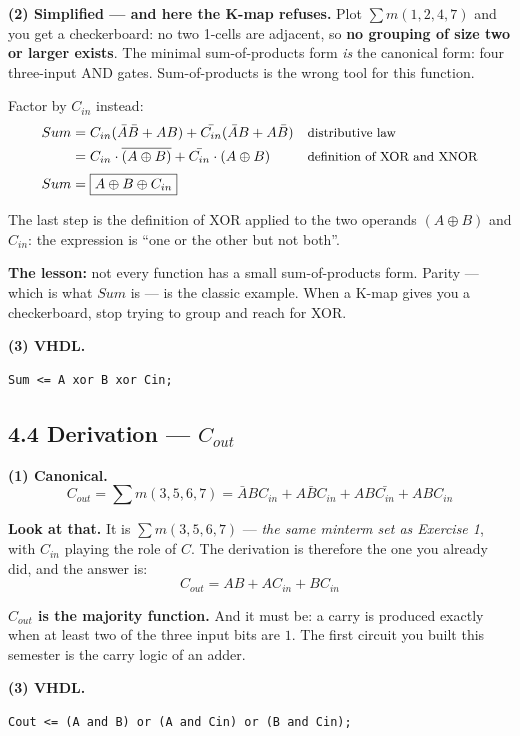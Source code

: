 \documentclass[11pt]{article}
\begin{document}
\textbf{(2) Simplified --- and here the K-map refuses.} Plot $\sum m(1,2,4,7)$ and
you get a checkerboard: no two 1-cells are adjacent, so \textbf{no grouping of size
two or larger exists}. The minimal sum-of-products form \emph{is} the canonical
form: four three-input AND gates. Sum-of-products is the wrong tool for this
function.

Factor by $C_{in}$ instead:
\begin{align*}
Sum &= C_{in}(\bar{A}\bar{B} + AB) + \bar{C_{in}}(\bar{A}B + A\bar{B}) && \text{\small distributive law} \\
    &= C_{in}\cdot\overline{(A \oplus B)} + \bar{C_{in}}\cdot(A \oplus B) && \text{\small definition of XOR and XNOR} \\[2pt]
Sum &= \boxed{A \oplus B \oplus C_{in}}
\end{align*}

The last step is the definition of XOR applied to the two operands $(A \oplus B)$ and
$C_{in}$: the expression is ``one or the other but not both''.

\textbf{The lesson:} not every function has a small sum-of-products form. Parity ---
which is what $Sum$ is --- is the classic example. When a K-map gives you a
checkerboard, stop trying to group and reach for XOR.

\textbf{(3) VHDL.}
\begin{lstlisting}
Sum <= A xor B xor Cin;
\end{lstlisting}

\subsection*{4.4 Derivation --- $C_{out}$}

\textbf{(1) Canonical.}
\[
C_{out} = \sum m(3,5,6,7) = \bar{A}BC_{in} + A\bar{B}C_{in} + AB\bar{C_{in}} + ABC_{in}
\]

\textbf{Look at that.} It is $\sum m(3,5,6,7)$ --- \emph{the same minterm set as
Exercise 1}, with $C_{in}$ playing the role of $C$. The derivation is therefore the
one you already did, and the answer is:
\[
C_{out} = \boxed{AB + AC_{in} + BC_{in}}
\]

\textbf{$C_{out}$ is the majority function.} And it must be: a carry is produced
exactly when at least two of the three input bits are $1$. The first circuit you
built this semester is the carry logic of an adder.

\textbf{(3) VHDL.}
\begin{lstlisting}
Cout <= (A and B) or (A and Cin) or (B and Cin);
\end{lstlisting}
\end{document}
